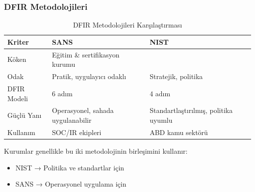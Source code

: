 \subsubsection{DFIR Metodolojileri}

\begin{table}[ht]
\centering
\begin{tabular}{|p{4cm}|p{6cm}|p{4cm}|}
\hline
\hline
\textbf{Kriter} & \textbf{SANS} & \textbf{NIST} \\
\hline
\hline
Köken & Eğitim \& sertifikasyon kurumu  \\
\hline
\hline
Odak & Pratik, uygulayıcı odaklı & Stratejik, politika \ \\
\hline
\hline
DFIR Modeli & 6 adım & 4 adım \\
\hline
\hline
Güçlü Yanı & Operasyonel, sahada uygulanabilir & Standartlaştırılmış, politika uyumlu \\
\hline
\hline
Kullanım & SOC/IR ekipleri & ABD kamu sektörü \ \\
\hline
\hline
\hline
\end{tabular}
\caption{DFIR Metodolojileri Karşılaştırması}
\end{table}

Kurumlar genellikle bu iki metodolojinin birleşimini kullanır:
\begin{itemize}
    \item NIST → Politika ve standartlar için
    \item SANS → Operasyonel uygulama için
\end{itemize}

